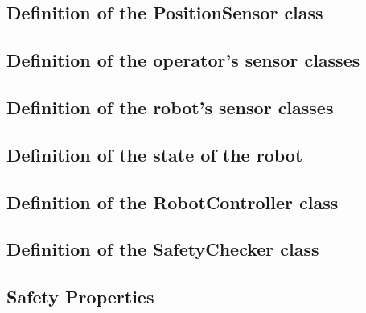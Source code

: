 \documentclass[a4paper]{article}
\begin{document}
\pagebreak
\subsection{Definition of the PositionSensor class}


\pagebreak
\subsection{Definition of the operator's sensor classes}


\pagebreak



\pagebreak
\subsection{Definition of the robot's sensor classes}


\pagebreak


\pagebreak
\subsection{Definition of the state of the robot}


\pagebreak
\subsection{Definition of the RobotController class}


\pagebreak
\subsection{Definition of the SafetyChecker class}


\pagebreak
\subsection{Safety Properties}



% 
\end{document}
